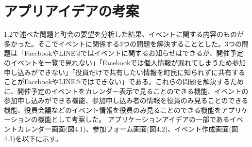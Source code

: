 \section{アプリアイデアの考案}
1.2で述べた問題と町会の要望を分析した結果、イベントに関する内容のものが多かった。そこでイベントに関係する3つの問題を解決することとした。3つの問題は「FacebookやLINE@ではイベントに関するお知らせはできるが、開催予定のイベントを一覧で見れない」「Facebookでは個人情報が漏れてしまうため参加申し込みができない」「役員だけで共有したい情報を町民に知られずに共有することがFacebookやLINE@ではできない」である。これらの問題を解決するために、開催予定のイベントをカレンダー表示で見ることのできる機能、イベントの参加申し込みができる機能、参加申し込み者の情報を役員のみ見ることのできる機能、役員会議などのイベント情報を役員のみ見ることのできる機能をアプリケーションの機能として考案した。
アプリケーションアイデアの一部であるイベントカレンダー画面(図4.1)、参加フォーム画面(図4.2)、イベント作成画面(図4.3)を以下に示す。
\newpage
